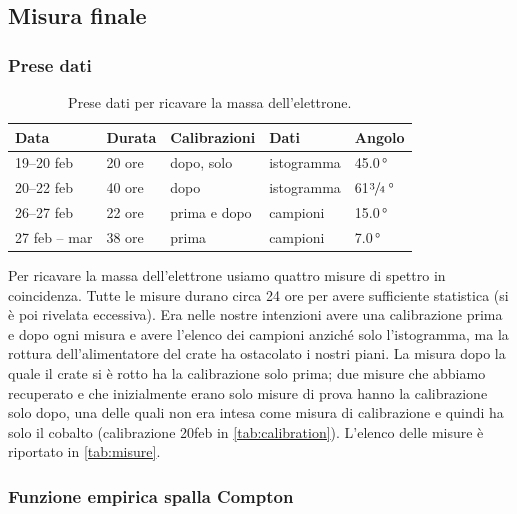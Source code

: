 \subsection{Misura finale}\label{par:fondo2}

\subsubsection{Prese dati}

\begin{table}
	\centering
	\begin{tabular}{lllll}
		\toprule
		Data & Durata & Calibrazioni & Dati & Angolo \\
		\midrule
		19--20 feb    & 20 ore & dopo, solo \co & istogramma &           45.0\,\si{\degree} \\
		20--22 feb    & 40 ore & dopo           & istogramma &   61$\sfrac34$\,\si{\degree} \\
		26--27 feb    & 22 ore & prima e dopo   & campioni   &           15.0\,\si{\degree} \\
		27 feb \!--\! 1 mar & 38 ore & prima          & campioni   & \phantom{1}7.0\,\si{\degree} \\
		\bottomrule
	\end{tabular}
	\caption{\label{tab:misure}
	Prese dati per ricavare la massa dell'elettrone.}
\end{table}

Per ricavare la massa dell'elettrone usiamo quattro misure di spettro in coincidenza.
Tutte le misure durano circa 24 ore per avere sufficiente statistica (si è poi rivelata eccessiva).
Era nelle nostre intenzioni avere una calibrazione prima e dopo ogni misura
e avere l'elenco dei campioni anziché solo l'istogramma,
ma la rottura dell'alimentatore del crate ha ostacolato i nostri piani.
La misura dopo la quale il crate si è rotto ha la calibrazione solo prima;
due misure che abbiamo recuperato e che inizialmente erano solo misure di prova hanno la calibrazione solo dopo,
una delle quali non era intesa come misura di calibrazione e quindi ha solo il cobalto
(calibrazione 20feb in \autoref{tab:calibration}).
L'elenco delle misure è riportato in \autoref{tab:misure}.

\subsubsection{Funzione empirica spalla Compton}

